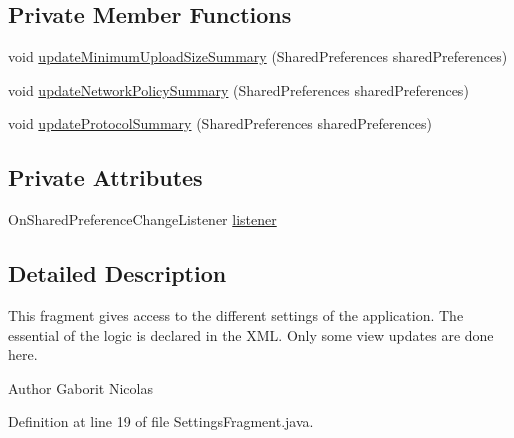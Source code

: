 \subsection*{Private Member Functions}
\begin{DoxyCompactItemize}
\item 
void \hyperlink{classcom_1_1qualoutdoor_1_1recorder_1_1settings_1_1SettingsFragment_a10c070e465872c5cdccf51c7bf975501}{update\-Minimum\-Upload\-Size\-Summary} (Shared\-Preferences shared\-Preferences)
\item 
void \hyperlink{classcom_1_1qualoutdoor_1_1recorder_1_1settings_1_1SettingsFragment_afa4141070c837fc5934be099fcb4ce20}{update\-Network\-Policy\-Summary} (Shared\-Preferences shared\-Preferences)
\item 
void \hyperlink{classcom_1_1qualoutdoor_1_1recorder_1_1settings_1_1SettingsFragment_a224b8945815532c1943d515223816d95}{update\-Protocol\-Summary} (Shared\-Preferences shared\-Preferences)
\end{DoxyCompactItemize}
\subsection*{Private Attributes}
\begin{DoxyCompactItemize}
\item 
On\-Shared\-Preference\-Change\-Listener \hyperlink{classcom_1_1qualoutdoor_1_1recorder_1_1settings_1_1SettingsFragment_af4f15ade12aa826f88f38801736010f6}{listener}
\end{DoxyCompactItemize}


\subsection{Detailed Description}
This fragment gives access to the different settings of the application. The essential of the logic is declared in the X\-M\-L. Only some view updates are done here.

\begin{DoxyAuthor}{Author}
Gaborit Nicolas 
\end{DoxyAuthor}


Definition at line 19 of file Settings\-Fragment.\-java.



